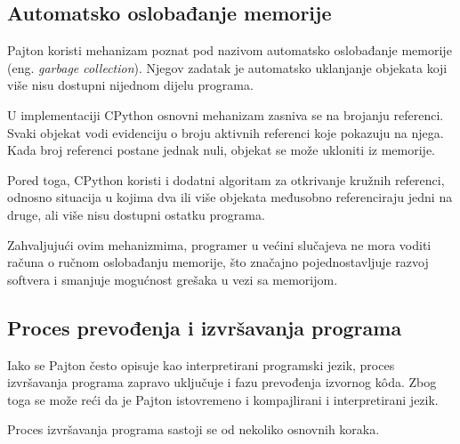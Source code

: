 \subsection{Automatsko oslobađanje memorije}

Pajton koristi mehanizam poznat pod nazivom automatsko oslobađanje memorije (eng. \textit{garbage collection}). Njegov zadatak je automatsko uklanjanje objekata koji više nisu dostupni nijednom dijelu programa.

U implementaciji CPython osnovni mehanizam zasniva se na brojanju referenci. Svaki objekat vodi evidenciju o broju aktivnih referenci koje pokazuju na njega. Kada broj referenci postane jednak nuli, objekat se može ukloniti iz memorije.

Pored toga, CPython koristi i dodatni algoritam za otkrivanje kružnih referenci, odnosno situacija u kojima dva ili više objekata međusobno referenciraju jedni na druge, ali više nisu dostupni ostatku programa.

Zahvaljujući ovim mehanizmima, programer u većini slučajeva ne mora voditi računa o ručnom oslobađanju memorije, što značajno pojednostavljuje razvoj softvera i smanjuje mogućnost grešaka u vezi sa memorijom.

\subsection{Proces prevođenja i izvršavanja programa}

Iako se Pajton često opisuje kao interpretirani programski jezik, proces izvršavanja programa zapravo uključuje i fazu prevođenja izvornog k\^oda. Zbog toga se može reći da je Pajton istovremeno i kompajlirani i interpretirani jezik.

Proces izvršavanja programa sastoji se od nekoliko osnovnih koraka.

